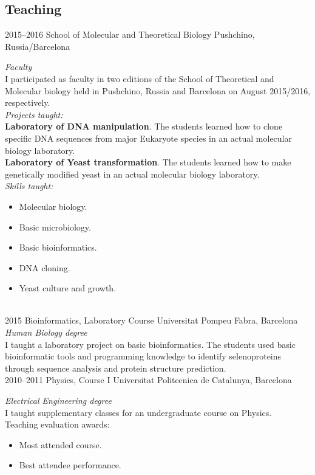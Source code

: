 \documentclass[]{friggeri-cv} %
\begin{document}
\subsection{Teaching}

\begin{entrylist}

\entry
{2015--2016}
{School of Molecular and Theoretical Biology}
{Pushchino, Russia/Barcelona}
{\emph{Faculty}\\
I participated as faculty in two editions of the School of Theoretical
and Molecular biology held in Pushchino, Russia and Barcelona on
August 2015/2016, respectively.\\
{\em Projects taught:}\\
{\bf Laboratory of DNA manipulation}. The students learned how to clone specific DNA
sequences from major Eukaryote species in an actual molecular biology laboratory. \\
{\bf Laboratory of Yeast transformation}. The students learned how to make genetically
modified yeast in an actual molecular biology laboratory. \\
{\em Skills taught:}
\begin{itemize}
  \item Molecular biology.
  \item Basic microbiology.
  \item Basic bioinformatics.
  \item DNA cloning.
  \item Yeast culture and growth.
\end{itemize}
}\\



\entry
{2015}
{Bioinformatics, Laboratory Course}
{Universitat Pompeu Fabra, Barcelona}
{\emph{Human Biology degree} \\
I taught a laboratory project on basic bioinformatics. The students
used basic bioinformatic tools and programming knowledge to
identify selenoproteins through sequence analysis and protein
structure prediction.} \\


\entry
{2010--2011}
{Physics, Course I}
{Universitat Politecnica de Catalunya, Barcelona}
{\emph{Electrical Engineering degree} \\
  I taught supplementary classes for an undergraduate course on Physics. \\
  Teaching evaluation awards:
  \begin{itemize}
    \item Most attended course.
    \item Best attendee performance.
  \end{itemize}
}


\end{entrylist}
\end{document}
